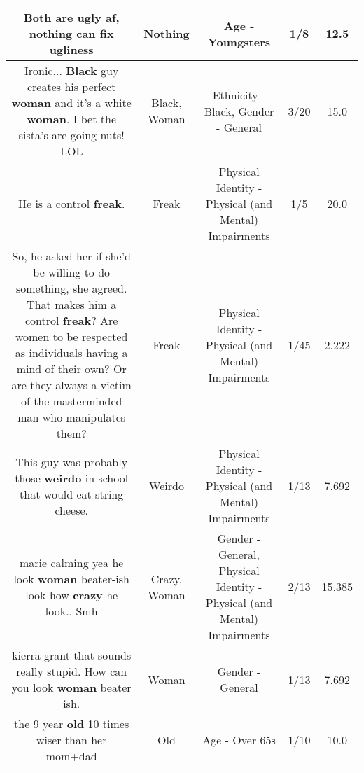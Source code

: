 \documentclass[11pt]{article}
\newlength\mylength
\begin{document}
\begin{center}
\begin{longtable}{|C{.65\mylength}|C{.30\mylength}|C{.12\mylength}|C{.12\mylength}|C{.12\mylength}|}
  \small Both are ugly af, \textbf{nothing} can fix ugliness\normalsize   & Nothing & Age - Youngsters & 1/8 & 12.5 \\  \hline
  \small Ironic...  \textbf{Black} guy creates his perfect \textbf{woman} and it's a white \textbf{woman}.  I bet the sista's are going nuts!  LOL\normalsize   & Black, Woman & Ethnicity - Black, Gender - General & 3/20 & 15.0 \\  \hline
  \small He is a control \textbf{freak}.\normalsize   & Freak & Physical Identity - Physical (and Mental) Impairments & 1/5 & 20.0 \\  \hline
  \small So, he asked her if she'd be willing to do something, she agreed. That makes him a control \textbf{freak}? Are women to be respected as individuals having a mind of their own? Or are they always a victim of the masterminded man who manipulates them?\normalsize   & Freak & Physical Identity - Physical (and Mental) Impairments & 1/45 & 2.222 \\  \hline
  \small This guy was probably those \textbf{weirdo} in school that would eat string cheese.\normalsize   & Weirdo & Physical Identity - Physical (and Mental) Impairments & 1/13 & 7.692 \\  \hline
  \small marie calming yea he look \textbf{woman} beater-ish look how \textbf{crazy} he look.. Smh\normalsize   & Crazy, Woman & Gender - General, Physical Identity - Physical (and Mental) Impairments & 2/13 & 15.385 \\  \hline
  \small kierra grant that sounds really stupid. How can you look \textbf{woman} beater ish.\normalsize   & Woman & Gender - General & 1/13 & 7.692 \\  \hline
  \small the 9 year \textbf{old} 10 times wiser than her mom+dad\normalsize   & Old & Age - Over 65s & 1/10 & 10.0 \\  \hline

\end{longtable}
\end{center}
\end{document}
